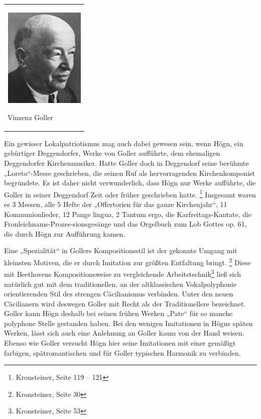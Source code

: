 \begin{center}
\begin{minipage}{4.249cm}
\begin{flushleft}
\tablefirsthead{}
\tablehead{}
\tabletail{}
\tablelasttail{}
\begin{supertabular}{m{4.0490003cm}}

\includegraphics[width=3.866cm,height=4.773cm]{pictures/zulassungsarbeit-img089.jpg}

Vinzenz Goller\\
\end{supertabular}
\end{flushleft}
\end{minipage}
\end{center}

\begin{figure}
\img{}
\caption{}
\end{figure}

Ein gewisser Lokalpatriotismus mag auch dabei gewesen sein, wenn Högn,
ein gebürtiger Deggendorfer, Werke von Goller aufführte, dem ehemaligen
Deggendorfer Kirchenmusiker. Hatte Goller doch in Deggendorf seine
berühmte „Loreto“-Messe geschrieben, die seinen Ruf als hervorragenden
Kirchenkomponist begründete. Es ist daher nicht verwunderlich, dass
Högn nur Werke aufführte, die Goller in seiner Deggendorf Zeit oder
früher geschrieben hatte. \footnote{Kronsteiner, Seite 119 – 121}
Insgesamt waren es 3 Messen, alle 5 Hefte der „Offertorien für das
ganze Kirchenjahr“, 11 Kommunionlieder, 12 Pange
lingua,\textcolor[rgb]{0.6,0.6,0.6}{ }2 Tantum ergo, die
Karfreitags-Kantate, die Fronleichnams-Prozes-sionsgesänge und das
Orgelbuch zum Lob Gottes op. 61, die durch Högn zur Aufführung kamen.

Eine „Spezialität“ in Gollers Kompositionsstil ist der gekonnte Umgang
mit kleinsten Motiven, die er durch Imitation zur größten Entfaltung
bringt. \footnote{Kronsteiner, Seite 30} Diese mit Beethovens
Kompositionsweise zu vergleichende Arbeitstechnik\footnote{
Kronsteiner, Seite 53} ließ sich natürlich gut mit dem traditionellen,
an der altklassischen Vokalpolyphonie orientierenden Stil des strengen
Cäcilianismus verbinden. Unter den neuen Cäcilianern wird deswegen
Goller mit Recht als der Traditionellere bezeichnet. Goller kann Högn
deshalb bei seinen frühen Werken „Pate“ für so manche polyphone Stelle
gestanden haben. Bei den wenigen Imitationen in Högns späten Werken,
lässt sich auch eine Anlehnung an Goller kaum von der Hand weisen.
Ebenso wie Goller versucht Högn hier seine Imitationen mit einer
gemäßigt farbigen, spätromantischen und für Goller typischen Harmonik
zu verbinden.


